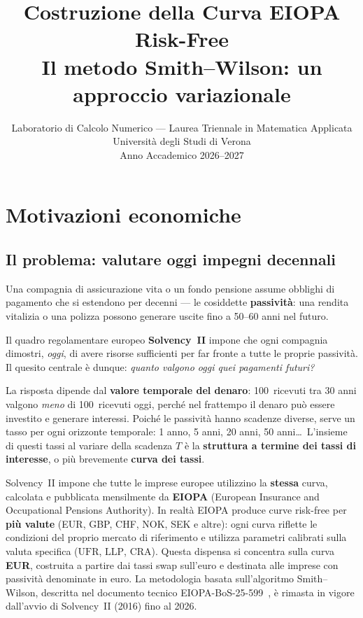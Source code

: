 \documentclass[11pt,a4paper]{article}
\title{%
  \textbf{Costruzione della Curva EIOPA Risk-Free}\\[6pt]
  \large Il metodo Smith--Wilson: un approccio variazionale\\[4pt]
}
\author{Laboratorio di Calcolo Numerico --- Laurea Triennale in Matematica Applicata\\
  Universit\`a degli Studi di Verona\\[2pt]
  Anno Accademico 2026--2027}
\date{}
\theoremstyle{plain}
\theoremstyle{definition}
\theoremstyle{remark}
\newcommand{\UFR}{\ensuremath{\mathrm{UFR}}}
\newcommand{\LLP}{\ensuremath{\mathrm{LLP}}}
\newcommand{\CRA}{\ensuremath{\mathrm{CRA}}}
\begin{document}
\maketitle
\tableofcontents
\newpage

\section{Motivazioni economiche}

\subsection{Il problema: valutare oggi impegni decennali}

Una compagnia di assicurazione vita o un fondo pensione assume obblighi di pagamento che si
estendono per decenni --- le cosiddette \textbf{passività}: una rendita vitalizia o una
polizza possono generare uscite fino a 50--60 anni nel futuro.

Il quadro regolamentare europeo \textbf{Solvency~II} impone che ogni compagnia dimostri,
\emph{oggi}, di avere risorse sufficienti per far fronte a tutte le proprie passività. Il
quesito centrale \`e dunque: \emph{quanto valgono oggi quei pagamenti futuri?}

La risposta dipende dal \textbf{valore temporale del denaro}: 100\,\texteuro{} ricevuti tra
30 anni valgono \emph{meno} di 100\,\texteuro{} ricevuti oggi, perch\'e nel frattempo il
denaro pu\`o essere investito e generare interessi. Poich\'e le passivit\`a hanno scadenze
diverse, serve un tasso per ogni orizzonte temporale: 1 anno, 5 anni, 20 anni, 50 anni\ldots\
L'insieme di questi tassi al variare della scadenza $T$ \`e la \textbf{struttura a termine
dei tassi di interesse}, o pi\`u brevemente \textbf{curva dei tassi}.

Solvency~II impone che tutte le imprese europee utilizzino la \textbf{stessa} curva,
calcolata e pubblicata mensilmente da \textbf{EIOPA} (European Insurance and Occupational
Pensions Authority). In realt\`a EIOPA produce curve risk-free per \textbf{pi\`u valute}
(EUR, GBP, CHF, NOK, SEK e altre): ogni curva riflette le condizioni del proprio mercato
di riferimento e utilizza parametri calibrati sulla valuta specifica ($\UFR$, $\LLP$,
$\CRA$). Questa dispensa si concentra sulla curva \textbf{EUR}, costruita a partire dai
tassi swap sull'euro e destinata alle imprese con passivit\`a denominate in euro. La
metodologia basata sull'algoritmo Smith--Wilson, descritta nel documento tecnico
EIOPA-BoS-25-599~\cite{eiopa2025}, \`e rimasta in vigore dall'avvio di Solvency~II (2016)
fino al 2026.
\end{document}
